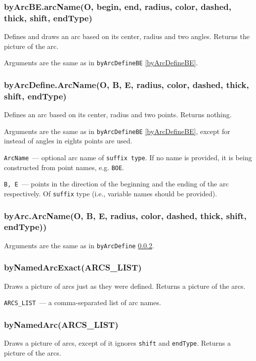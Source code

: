 \subsubsection{byArcBE.arcName(O, begin, end, radius, color, dashed, thick, shift, endType)}\label{byArcBE}

	Defines and draws an arc based on its center, radius and two angles. Returns the picture of the arc.
	
	Arguments are the same as in \texttt{byArcDefineBE} \ref{byArcDefineBE}.

\subsubsection{byArcDefine.ArcName(O, B, E, radius, color, dashed, thick, shift, endType)}\label{byArcDefine}
	
	Defines an arc based on its center, radius and two points. Returns nothing.
	
	Arguments are the same as in \texttt{byArcDefineBE} \ref{byArcDefineBE}, except for instead of angles in eights points are used.
	
	\texttt{ArcName}~— optional arc name of \texttt{suffix type}. If no name is provided, it is being constructed from point names, e.g. \texttt{BOE}.
	
	\texttt{B, E}~— points in the direction of the beginning and the ending of the arc respectively. Of \texttt{suffix} type (i.e., variable names should be provided).

\subsubsection{byArc.ArcName(O, B, E, radius, color, dashed, thick, shift, endType))}\label{byArc}
	
	Arguments are the same as in \texttt{byArcDefine} \ref{byArcDefine}.
	
\subsubsection{byNamedArcExact(ARCS\_LIST)}\label{byNamedArcExact}
	Draws a picture of arcs just as they were defined. Returns a picture of the arcs.
	
	\texttt{ARCS\_LIST}~— a comma-separated list of arc names.
	
\subsubsection{byNamedArc(ARCS\_LIST)}\label{byNamedArc}
	Draws a picture of arcs, except of it ignores \texttt{shift} and \texttt{endType}. Returns a picture of the arcs.
	

